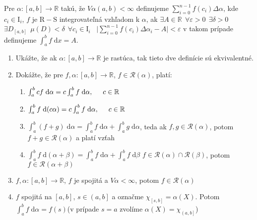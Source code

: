 \documentclass[12pt]{article}
\newcommand{\ud}{\;\mathrm{d}}
\newcommand{\cinterval}[1]{\ensuremath{\left[#1\right]}}
\newcommand{\ointerval}[1]{\ensuremath{\left(#1\right)}}
\newcommand\tab[1][0.5cm]{\hspace*{#1}}
\begin{document}
Pre $\alpha: \cinterval{a,b} \rightarrow \mathbb{R}$ takú, že
$V\alpha \ointerval{a,b} < \infty$ definujeme
$\sum\limits_{i=0}^{n-1} f(c_i) \Delta \alpha$, kde $c_i \in \mathrm{I}_i$,
$f$ je $\mathrm{R}-\mathrm{S}$ integrovateľná vzhľadom k $\alpha$, ak \newline
\tab $\exists A\in \mathbb{R} \ \ \forall \varepsilon > 0 \ \ \exists \delta > 0$
$\exists D_{\cinterval{a,b}} \ \ \mu(D)<\delta \ \ \forall c_i \in \mathrm{I}_i$
\ $\Big|\sum\limits_{i=0}^{n-1} f(c_i)\Delta\alpha_i-A\Big| < \varepsilon$ \newline
v takom prípade definujeme $\int_{a}^{b}f\ud x = A$.

\begin{enumerate}
    \item Ukážte, že ak $\alpha: \cinterval{a,b}\rightarrow\mathbb{R}$ je rastúca,
        tak tieto dve definície sú ekvivalentné.

    \item Dokážte, že pre $f,\alpha: \cinterval{a,b}\rightarrow\mathbb{R}$,
        $f\in\mathcal{R}(\alpha)$, platí: \newline
        \begin{enumerate}
            \item $\int_a^b cf\ud\alpha = c\int_a^b f\ud\alpha,\tab c\in \mathbb{R}$
            \item $\int_a^b f\ud(c\alpha) = c\int_a^b f\ud\alpha,\tab c\in \mathbb{R}$
            \item $\int_a^b (f+g)\ud\alpha = \int_a^b f\ud\alpha + \int_a^b g\ud\alpha$,
                \tab teda ak $f,g \in \mathcal{R}(\alpha)$, potom $f+g \in \mathcal{R}(\alpha)$
                a platí vzťah
            \item $\int_a^b f\ud(\alpha + \beta) = \int_a^b f\ud\alpha + \int_a^b f\ud\beta$
                \tab $f \in \mathcal{R}(\alpha)\cap\mathcal{R}(\beta)$, potom $f\in \mathcal{R}(\alpha + \beta)$
        \end{enumerate}

    \item $f,\alpha: \cinterval{a,b}\rightarrow\mathbb{R}$, $f$ je spojitá a $V\alpha<\infty$,
        potom $f\in\mathcal{R}(\alpha)$

    \item $f$ spojitá na $\cinterval{a,b}$, $s\in\left(a,b\right]$ a označme
        $\chi_{\cinterval{s,b}}=\alpha(X)$. Potom
        $\int_a^b f\ud\alpha = f(s)$\tab (v prípade $s=a$ zvolíme
        $\alpha(X)=\chi_{\left(a,b\right]}$)


\end{enumerate}
\end{document}
